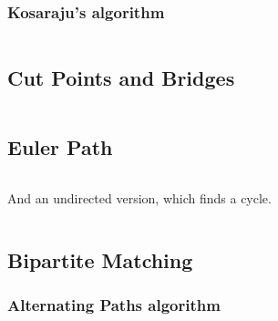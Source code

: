 \documentclass[8pt,a4paper,landscape,oneside]{amsart}
\newcommand{\code}[1]{\inputminted[fontsize=\normalsize,baselinestretch=1]{cpp}{_code/#1}}
\newif\ifverbose
\begin{document}
\begin{multicols*}{3}
        \subsubsection{Kosaraju's algorithm}
            \ifverbose
            Kosarajus's algorithm finds strongly connected components of a
            directed graph in $O(|V|+|E|)$ time.
            \fi
            \code{graph/scc.cpp}

    \subsection{Cut Points and Bridges}
        \code{graph/cut_points_and_bridges.cpp}

    \ifverbose
    \subsection{Minimum Spanning Tree}
        \subsubsection{Kruskal's algorithm}
            \code{graph/kruskals_mst.cpp}
    \fi

    \ifverbose
    \subsection{Topological Sort}
        \subsubsection{Modified Depth-First Search}
            \code{graph/tsort.cpp}
    \fi

    \subsection{Euler Path}
        \ifverbose
        Finds an euler path (or circuit) in a directed graph, or reports that
        none exist.
        \fi
        \code{graph/euler_path.cpp}
        And an undirected version, which finds a cycle.
        \code{graph/euler_path_undirected.cpp}

    \subsection{Bipartite Matching}

        \subsubsection{Alternating Paths algorithm}
            \ifverbose
            The alternating paths algorithm solves bipartite matching in $O(mn^2)$
            time, where $m$, $n$ are the number of vertices on the left and right
            side of the bipartite graph, respectively.
            \fi
            \code{graph/bipartite_matching.cpp}


\end{multicols*}
\end{document}
